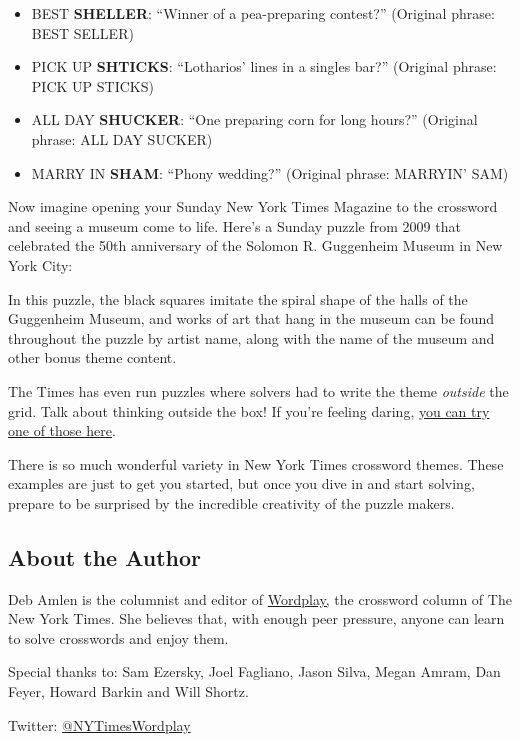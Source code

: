 \begin{itemize}
\tightlist
\item
  BEST \textbf{SHELLER}: ``Winner of a pea-preparing contest?''
  (Original phrase: BEST SELLER)
\item
  PICK UP \textbf{SHTICKS}: ``Lotharios' lines in a singles bar?''
  (Original phrase: PICK UP STICKS)
\item
  ALL DAY \textbf{SHUCKER}: ``One preparing corn for long hours?''
  (Original phrase: ALL DAY SUCKER)
\item
  MARRY IN \textbf{SHAM}: ``Phony wedding?'' (Original phrase: MARRYIN'
  SAM)
\end{itemize}

Now imagine opening your Sunday New York Times Magazine to the crossword
and seeing a museum come to life. Here's a Sunday puzzle from 2009 that
celebrated the 50th anniversary of the Solomon R. Guggenheim Museum in
New York City:

In this puzzle, the black squares imitate the spiral shape of the halls
of the Guggenheim Museum, and works of art that hang in the museum can
be found throughout the puzzle by artist name, along with the name of
the museum and other bonus theme content.

The Times has even run puzzles where solvers had to write the theme
\emph{outside} the grid. Talk about thinking outside the box! If you're
feeling daring,
\href{https://www.nytimes.com/crosswords/game/daily/2006/04/01}{you can
try one of those here}.~

There is so much wonderful variety in New York Times crossword themes.
These examples are just to get you started, but once you dive in and
start solving, prepare to be surprised by the incredible creativity of
the puzzle makers.

\hypertarget{about-the-author}{%
\subsection{About the Author}\label{about-the-author}}

Deb Amlen is the columnist and editor of
\href{https://www.nytimes.com/column/wordplay}{Wordplay,} the crossword
column of The New York Times. She believes that, with enough peer
pressure, anyone can learn to solve crosswords and enjoy them.

Special thanks to: Sam Ezersky, Joel Fagliano, Jason Silva, Megan Amram,
Dan Feyer, Howard Barkin and Will Shortz.~

Twitter:
\href{https://www.twitter.com/NYTimesWordplay}{@NYTimesWordplay}

